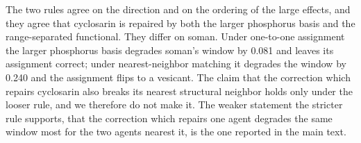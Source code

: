 \documentclass[11pt]{article}
\begin{document}
The two rules agree on the direction and on the ordering of the large effects, and they
agree that cyclosarin is repaired by both the larger phosphorus basis and the
range-separated functional. They differ on soman. Under one-to-one assignment the larger
phosphorus basis degrades soman's window by 0.081 and leaves its assignment correct; under
nearest-neighbor matching it degrades the window by 0.240 and the assignment flips to a
vesicant. The claim that the correction which repairs cyclosarin also breaks its nearest
structural neighbor holds only under the looser rule, and we therefore do not make it. The
weaker statement the stricter rule supports, that the correction which repairs one agent
degrades the same window most for the two agents nearest it, is the one reported in the
main text.

\end{document}
